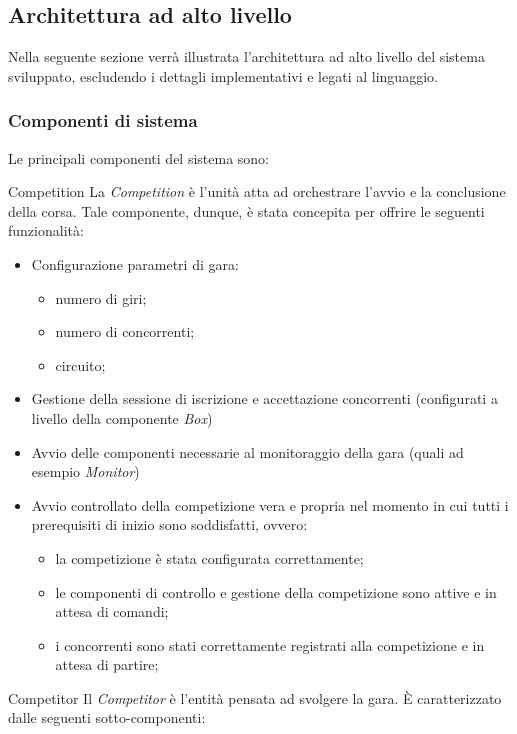 \subsection{Architettura ad alto livello}
Nella seguente sezione verr\`{a} illustrata l'architettura ad alto livello del sistema sviluppato, 
escludendo i dettagli implementativi e legati al linguaggio.
\subsubsection{Componenti di sistema}
Le principali componenti del sistema sono:
\begin{description}
\item{Competition}
La \emph{Competition} è l'unità atta ad orchestrare l'avvio e la conclusione della corsa. Tale componente, dunque, è stata concepita per 
offrire le seguenti funzionalità:
\begin{itemize}
\item Configurazione parametri di gara:
	\begin{itemize}
		\item numero di giri;
		\item numero di concorrenti;
		\item circuito;
	\end{itemize}
\item Gestione della sessione di iscrizione e accettazione concorrenti (configurati a livello della componente \emph{Box})
\item Avvio delle componenti necessarie al monitoraggio della gara (quali ad esempio \emph{Monitor})
\item Avvio controllato della competizione vera e propria nel momento in cui tutti i prerequisiti di inizio sono soddisfatti, ovvero:
\begin{itemize}
\item la competizione è stata configurata correttamente;
\item le componenti di controllo e gestione della competizione sono attive e in attesa di comandi;
\item i concorrenti sono stati correttamente registrati alla competizione e in attesa di partire;
\end{itemize}
\end{itemize}
\item{Competitor}
Il \emph{Competitor} è l'entità pensata ad svolgere la gara. \`{E} caratterizzato dalle seguenti sotto-componenti:
\begin{itemize}

\end{itemize}
\end{description}
